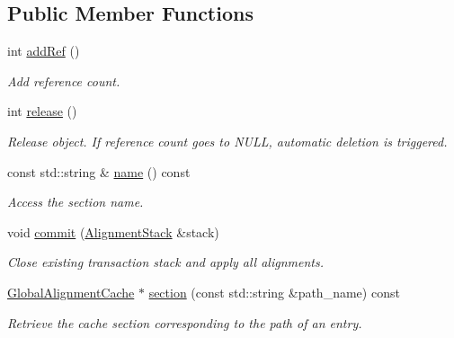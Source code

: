 \subsection*{Public Member Functions}
\begin{DoxyCompactItemize}
\item 
int \hyperlink{class_d_d4hep_1_1_alignments_1_1_global_alignment_cache_a51e8931621f844f3f81517f221b5fe98}{addRef} ()
\begin{DoxyCompactList}\small\item\em Add reference count. \item\end{DoxyCompactList}\item 
int \hyperlink{class_d_d4hep_1_1_alignments_1_1_global_alignment_cache_a7de701232e1c2da3ca981de290805060}{release} ()
\begin{DoxyCompactList}\small\item\em Release object. If reference count goes to NULL, automatic deletion is triggered. \item\end{DoxyCompactList}\item 
const std::string \& \hyperlink{class_d_d4hep_1_1_alignments_1_1_global_alignment_cache_a33fb44cff7b649a8bad98ec5589a31f7}{name} () const 
\begin{DoxyCompactList}\small\item\em Access the section name. \item\end{DoxyCompactList}\item 
void \hyperlink{class_d_d4hep_1_1_alignments_1_1_global_alignment_cache_a883c1f7d0e7687caab250c4de0ed59af}{commit} (\hyperlink{class_d_d4hep_1_1_alignments_1_1_alignment_stack}{AlignmentStack} \&stack)
\begin{DoxyCompactList}\small\item\em Close existing transaction stack and apply all alignments. \item\end{DoxyCompactList}\item 
\hyperlink{class_d_d4hep_1_1_alignments_1_1_global_alignment_cache}{GlobalAlignmentCache} $\ast$ \hyperlink{class_d_d4hep_1_1_alignments_1_1_global_alignment_cache_a792d4a08dcae4d185fa9a3ab2099aaef}{section} (const std::string \&path\_\-name) const 
\begin{DoxyCompactList}\small\item\em Retrieve the cache section corresponding to the path of an entry. \item\end{DoxyCompactList}\item 

\end{DoxyCompactItemize}
